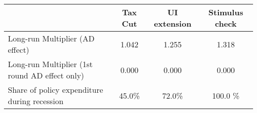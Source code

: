 \begin{tabular}{@{}lccc@{}} 
\toprule 
& Tax Cut    & UI extension    & Stimulus check    \\  \midrule 
Long-run Multiplier (AD effect) &1.042  & 1.255  & 1.318     \\ 
Long-run Multiplier (1st round AD effect only) &0.000  & 0.000  & 0.000     \\ 
Share of policy expenditure during recession &45.0\%  & 72.0\%  & 100.0 \%    \\ 
\end{tabular}  
